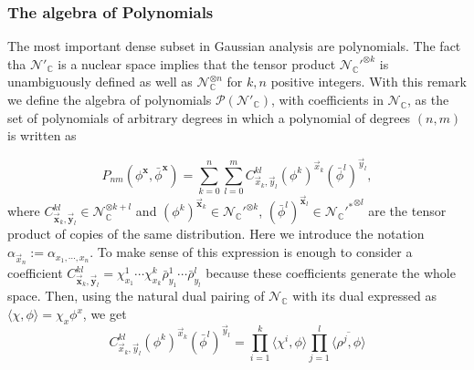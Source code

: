 \documentclass{elsarticle}%
\begin{document}
\subsubsection{The algebra of Polynomials}
\label{sssec:Polynomials}

 The most important dense subset in Gaussian analysis are polynomials.  The fact tha $\mathcal{N}'_{\mathbb{C}}$ is a nuclear space implies that the tensor product $ {\mathcal{N}_\mathbb{C}'}^{\otimes k}$ is unambiguously defined as well as $\mathcal{N}_{\mathbb{C}}^{\otimes n}$ for $k,n$ positive integers. With this remark we define the algebra of  polynomials $\mathcal{P}(\mathcal{N}'_\mathbb{C})$, with coefficients in $\mathcal{N}_{\mathbb{C}}$, as the set of polynomials of arbitrary degrees in which  a polynomial of degrees $(n,m)$ is  written as


 \begin{equation}
     \label{eq:polynomialscompl} 
     P_{nm}(\phi^{\mathbf{x}},\bar\phi^{\mathbf{x}})= \sum_{k=0}^n\sum_{l=0}^m C^{kl}_{\vec{x}_k,\vec{y}_l}(\phi^k)^{\vec{x}_k}(\bar\phi^l)^{\vec{y}_l},
 \end{equation}
  where $C^{kl}_{\vec{\mathbf{x}}_k,\vec{\mathbf{y}}_l}\in \mathcal{N}_{\mathbb{C}}^{\otimes k+l}$ and $(\phi^k)^{\vec{\mathbf{x}}_k}\in {\mathcal{N}_\mathbb{C}'}^{\otimes k}$, $(\bar\phi^l)^{\vec{\mathbf{x}}_l}\in {\mathcal{{N}_\mathbb{C}'}^*}^{\otimes l}$ are the tensor product of copies of the same distribution.  Here we introduce the notation $\alpha_{\vec{x}_n}:=\alpha_{x_1,\cdots,x_n}$.
  To make sense of this expression is enough to consider a coefficient $C^{kl}_{\vec{\mathbf{x}}_k,\vec{\mathbf{y}}_l}=\chi^1_{x_1}\cdots\chi^k_{x_k}{\bar\rho}^1_{y_1}\cdots{\bar\rho}^l_{y_l}$ because these coefficients generate the whole space. Then, using the natural dual pairing of $\mathcal{N}_{\mathbb{C}}$ with its dual expressed as $\langle \chi,\phi \rangle= \chi_{x}\phi^x$, we get 
  $$
  C^{kl}_{\vec{x}_k,\vec{y}_l}(\phi^k)^{\vec{x}_k}
  (\bar\phi^l)^{\vec{y}_l}=\prod_{i=1}^k 
  \langle \chi^i,\phi \rangle
  \prod_{j=1}^l
   \overline{\langle \rho^j,\phi  \rangle}
 $$
\end{document}
